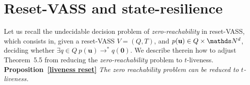 

\section{Reset-VASS and state-resilience}\label{appendix}







Let us recall the undecidable \cite{araki1976PN} decision problem of {\em zero-reachability} in reset-VASS, which consists in, given a
reset-VASS $V=(Q,T)$, and $p(\textbf{u}) \in Q \times \N^d$,
deciding whether $\exists q \in Q ~ p(\textbf{u}) \to^* q(\textbf{0})$.
We describe therein how to adjust Theorem~5.5 from \cite{peterson1981petri} reducing the {\em zero-reachability} problem to {\sc $t$-liveness}. \\

\noindent
\textbf{Proposition~\ref{liveness reset}}
{\em The  zero reachability problem can be reduced to {\sc $t$-liveness}.}



